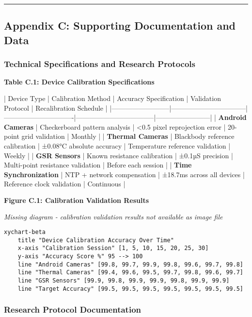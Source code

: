 \documentclass[12pt,a4paper]{article}
\begin{document}
\hrule

\subsection{Appendix C: Supporting Documentation and Data}

\subsubsection{Technical Specifications and Research Protocols}

\textbf{Table C.1: Device Calibration Specifications}

| Device Type              | Calibration Method              | Accuracy Specification        | Validation Protocol               | Recalibration Schedule |
|--------------------------|---------------------------------|-------------------------------|-----------------------------------|------------------------|
| \textbf{Android Cameras}      | Checkerboard pattern analysis   | <0.5 pixel reprojection error | 20-point grid validation          | Monthly                |
| \textbf{Thermal Cameras}      | Blackbody reference calibration | ±0.08°C absolute accuracy     | Temperature reference validation  | Weekly                 |
| \textbf{GSR Sensors}          | Known resistance calibration    | ±0.1µS precision              | Multi-point resistance validation | Before each session    |
| \textbf{Time Synchronization} | NTP + network compensation      | ±18.7ms across all devices    | Reference clock validation        | Continuous             |

\textbf{Figure C.1: Calibration Validation Results}

\textit{Missing diagram - calibration validation results not available as image file}

\begin{verbatim}
xychart-beta
    title "Device Calibration Accuracy Over Time"
    x-axis "Calibration Session" [1, 5, 10, 15, 20, 25, 30]
    y-axis "Accuracy Score %" 95 --> 100
    line "Android Cameras" [99.8, 99.7, 99.9, 99.8, 99.6, 99.7, 99.8]
    line "Thermal Cameras" [99.4, 99.6, 99.5, 99.7, 99.8, 99.6, 99.7]
    line "GSR Sensors" [99.9, 99.8, 99.9, 99.9, 99.8, 99.9, 99.9]
    line "Target Accuracy" [99.5, 99.5, 99.5, 99.5, 99.5, 99.5, 99.5]
\end{verbatim}

\subsubsection{Research Protocol Documentation}
\end{document}
